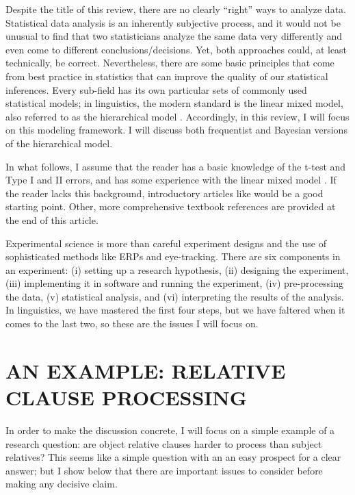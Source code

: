 \documentclass{ar-1col}\usepackage[]{graphicx}\usepackage[]{color}
\begin{document}
Despite the title of this review, there are no clearly ``right'' ways to analyze data. Statistical data analysis is an inherently subjective process, and it would not be unusual to find that two statisticians analyze the same data very differently and even come to different conclusions/decisions. Yet, both approaches could, at least technically, be correct. Nevertheless, there are some basic principles that come from best practice in statistics that can improve the quality of our statistical inferences. Every sub-field has its own particular sets of commonly used statistical models; in linguistics, the modern standard is the linear mixed model, also referred to as the hierarchical model \citep{pinheirobates}.  Accordingly, in this review, I will focus on this modeling framework. I will discuss both frequentist and Bayesian versions of the hierarchical model.

In what follows, I assume that the reader has a basic knowledge of the t-test and Type I and II errors, and has some experience with the linear mixed model \citep{lme4new}. If the reader lacks this background,  introductory articles like \citet{baayen2008mixed,VasishthNicenboimStatMeth,VasishthBeckmanetal} would be a good starting point. Other, more comprehensive textbook references are provided at the end of this article.


Experimental science is more than careful experiment designs and the use of sophisticated methods like ERPs and eye-tracking. There are six components in an experiment: (i) setting up a research hypothesis, (ii) designing the experiment, (iii) implementing it in software and running the experiment, (iv) pre-processing the data, (v) statistical analysis, and (vi) interpreting the results of the analysis.  In linguistics, we have mastered the first four steps, but we have faltered when it comes to the last two, so these are the issues I will focus on. 



\section{AN EXAMPLE: RELATIVE CLAUSE PROCESSING}

In order to make the discussion concrete, I will focus on a simple example of a research question: are object relative clauses harder to process than subject relatives? This seems like a simple question with an an easy prospect for a clear answer; but I show below that there are important issues to consider before making any decisive claim. 
\end{document}
